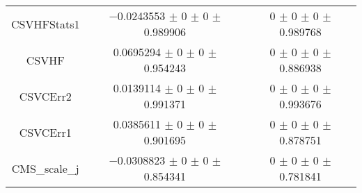 \begin{table}
\begin{tabular}{ccc}
CSVHFStats1 & \num{-0.0243553} $\pm$ \num{0} $\pm$ \num{0} $\pm$ \num{0.989906} & \num{0} $\pm$ \num{0} $\pm$ \num{0} $\pm$ \num{0.989768}\\
CSVHF & \num{0.0695294} $\pm$ \num{0} $\pm$ \num{0} $\pm$ \num{0.954243} & \num{0} $\pm$ \num{0} $\pm$ \num{0} $\pm$ \num{0.886938}\\
CSVCErr2 & \num{0.0139114} $\pm$ \num{0} $\pm$ \num{0} $\pm$ \num{0.991371} & \num{0} $\pm$ \num{0} $\pm$ \num{0} $\pm$ \num{0.993676}\\
CSVCErr1 & \num{0.0385611} $\pm$ \num{0} $\pm$ \num{0} $\pm$ \num{0.901695} & \num{0} $\pm$ \num{0} $\pm$ \num{0} $\pm$ \num{0.878751}\\
CMS\_scale\_j & \num{-0.0308823} $\pm$ \num{0} $\pm$ \num{0} $\pm$ \num{0.854341} & \num{0} $\pm$ \num{0} $\pm$ \num{0} $\pm$ \num{0.781841}\\
\bottomrule
\end{tabular}
\end{table}